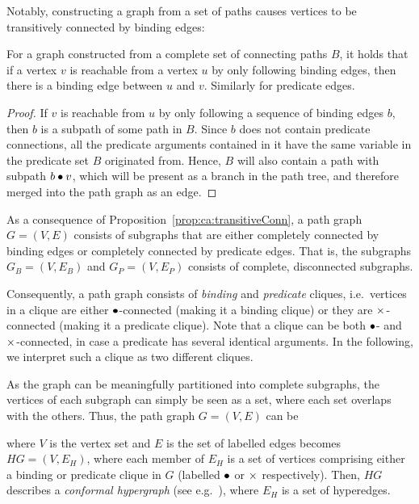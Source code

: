 \documentclass[../Master.tex]{subfiles}
\begin{document}
Notably, constructing a graph from a set of paths causes vertices to be transitively connected by binding edges:

\begin{proposition}\label{prop:ca:transitiveConn}
    For a graph constructed from a complete set of connecting paths $B$, it holds that if a vertex $v$ is reachable from a vertex $u$ by only following binding edges, then there is a binding edge between $u$ and $v$. Similarly for predicate edges.
\end{proposition}

\begin{proof}
   If $v$ is reachable from $u$ by only following a sequence of binding edges $b$, then $b$ is a subpath of some path in $B$. Since $b$ does not contain predicate connections, all the predicate arguments contained in it have the same variable in the predicate set $B$ originated from. Hence, $B$ will also contain a path with subpath $b \bullet v$, which will be present as a branch in the path tree, and therefore merged into the path graph as an edge.
\end{proof}

As a consequence of Proposition~\ref{prop:ca:transitiveConn}, a path graph $G = (V,E)$ consists of subgraphs that are either completely connected by binding edges or completely connected by predicate edges. That is, the subgraphs $G_B = \left(V, E_B \right)$ and $G_P = \left( V, E_P \right)$ consists of complete, disconnected subgraphs.

Consequently, a path graph consists of \textit{binding} and \textit{predicate} cliques, i.e.\ vertices in a clique are either $\bullet$-connected (making it a binding clique) or they are $\times$-connected (making it a predicate clique). Note that a clique can be both $\bullet$- and $\times$-connected, in case a predicate has several identical arguments. In the following, we interpret such a clique as two different cliques.

As the graph can be meaningfully partitioned into complete subgraphs, the vertices of each subgraph can simply be seen as a set, where each set overlaps with the others. Thus, the path graph $G = (V, E)$ can be 

where $V$ is the vertex set and $E$ is the set of labelled edges becomes $HG = \left(V, E_H\right)$, where each member of $E_H$ is a set of vertices comprising either a binding or predicate clique in $G$ (labelled $\bullet$ or $\times$ respectively). Then, $HG$ describes a \emph{conformal hypergraph} (see e.g.\ \cite{bretto}), where $E_H$ is a set of hyperedges.
\end{document}
